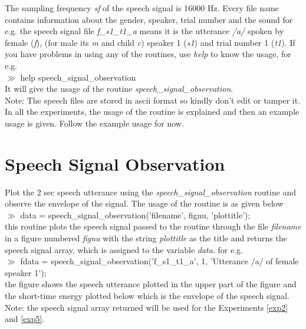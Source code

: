 The sampling frequency {\it sf} of the speech signal is 16000 Hz. Every
file name contains information about the 
gender, speaker, trial number and the sound for e.g. the speech signal
file {\it f\_s1\_t1\_a} means it is the utterance {\it /a/} spoken by female
({\it f}), (for male its {\it m} and child {\it c}) speaker 1 ({\it s1})
and trial number 1 ({\it t1}). If you have problems in using any
of the routines, use {\it help} to know the usage, for e.g.\\[1ex]
\noindent
$\gg$ help speech\_signal\_observation\\[1ex]
\noindent
It will give the usage of the routine {\it
speech\_signal\_observation}.\\[2ex]

Note: The speech files are stored in ascii format so kindly don't edit
or tamper it. In all the experiments, the usage of the routine is
explained and then an example usage is given. Follow the example usage
for now.
\section{Speech Signal Observation}
\label{exp1}
Plot the 2 sec speech utterance using the {\it
speech\_signal\_observation} routine and observe the envelope of the
signal. The usage of the routine is as given below\\[2ex]
\noindent
$\gg$ data = speech\_signal\_observation('filename', fignu,
'plottitle'); \\[1ex]
\noindent
this routine plots the speech signal passed to the routine through the
file {\it filename} in a figure numbered {\it fignu} with the string
{\it plottitle} as the title and returns the speech signal array,
which is assigned to the variable {\it data}. for e.g.\\[2ex]
\noindent
$\gg$ fdata = speech\_signal\_observation('f\_s1\_t1\_a', 1, 'Utterance
/a/ of female speaker 1'); \\[2ex]
\noindent
the figure shows the speech utterance plotted in the upper part of the
figure and the short-time energy plotted below which is the envelope
of the speech signal.\\[1ex]

\noindent
Note: the speech signal array returned will be used for the
Experiments \ref{exp2} and \ref{exp5}.

